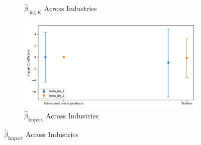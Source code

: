 \documentclass{article}
\begin{document}
\begin{figure}[ht!]
\begin{subfigure}[t]{0.32\textwidth}
        \caption{$\hat{\beta}_{\log K}$ Across Industries}
    \end{subfigure}
    \begin{subfigure}[t]{0.32\textwidth}
        \centering
        \includegraphics[width=\textwidth]{figure/ar1_mixture_kmshare_ciiu_beta_im_across_industries.png}
        \caption{$\hat{\beta}_{\text{Import}}$ Across Industries}
    \end{subfigure}
\end{figure}

\end{document}
